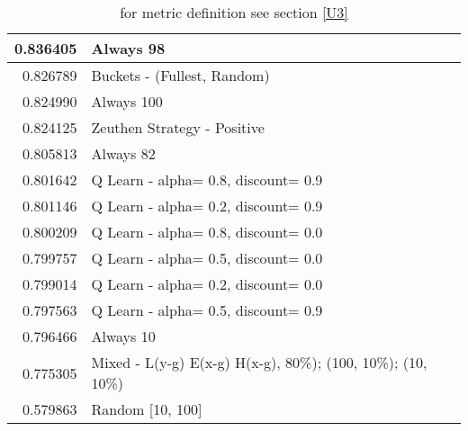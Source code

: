 \begin{table}[!hbtp]
\begin{footnotesize}
\begin{tabular}{|r|l|}
0.836405 & Always 98\\ \hline
0.826789 & Buckets - (Fullest, Random)\\ \hline
0.824990 & Always 100\\ \hline
0.824125 & Zeuthen Strategy - Positive\\ \hline
0.805813 & Always 82\\ \hline
0.801642 & Q Learn - alpha= 0.8, discount= 0.9\\ \hline
0.801146 & Q Learn - alpha= 0.2, discount= 0.9\\ \hline
0.800209 & Q Learn - alpha= 0.8, discount= 0.0\\ \hline
0.799757 & Q Learn - alpha= 0.5, discount= 0.0\\ \hline
0.799014 & Q Learn - alpha= 0.2, discount= 0.0\\ \hline
0.797563 & Q Learn - alpha= 0.5, discount= 0.9\\ \hline
0.796466 & Always 10\\ \hline
0.775305 & Mixed - {L(y-g) E(x-g) H(x-g), 80\%); (100, 10\%); (10, 10\%)}\\ \hline
0.579863 & Random [10, 100]\\ \hline
\end{tabular}
\caption{for metric definition see section \eqref{U3}}
\end{footnotesize}
\end{table}

